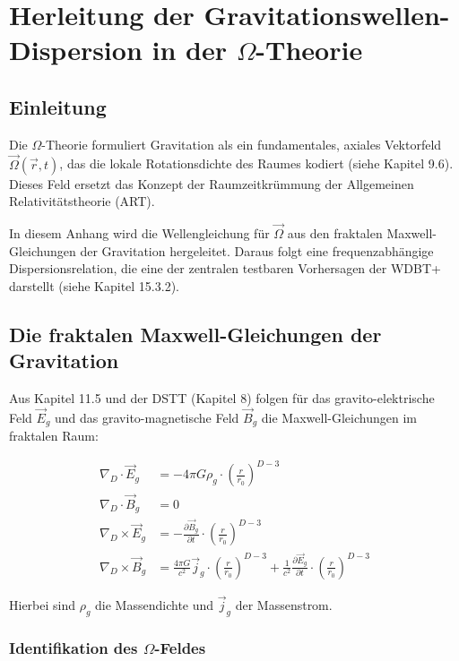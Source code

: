 \chapter{Herleitung der Gravitationswellen-Dispersion in der $\Omega$-Theorie}

\section{Einleitung}

Die $\Omega$-Theorie formuliert Gravitation als ein fundamentales, axiales Vektorfeld 
$\vec{\Omega}(\vec{r}, t)$, das die lokale Rotationsdichte des Raumes kodiert 
(siehe Kapitel 9.6). Dieses Feld ersetzt das Konzept der Raumzeitkrümmung der 
Allgemeinen Relativitätstheorie (ART).

In diesem Anhang wird die Wellengleichung für $\vec{\Omega}$ aus den fraktalen 
Maxwell-Gleichungen der Gravitation hergeleitet. Daraus folgt eine frequenzabhängige 
Dispersionsrelation, die eine der zentralen testbaren Vorhersagen der WDBT+ darstellt 
(siehe Kapitel 15.3.2).

\section{Die fraktalen Maxwell-Gleichungen der Gravitation}

Aus Kapitel 11.5 und der DSTT (Kapitel 8) folgen für das gravito-elektrische Feld 
$\vec{E}_g$ und das gravito-magnetische Feld $\vec{B}_g$ die Maxwell-Gleichungen 
im fraktalen Raum:

\begin{align}
\nabla_D \cdot \vec{E}_g &= -4\pi G\rho_g \cdot \left(\frac{r}{r_0}\right)^{D-3} \tag{I.1} \\
\nabla_D \cdot \vec{B}_g &= 0 \tag{I.2} \\
\nabla_D \times \vec{E}_g &= -\frac{\partial \vec{B}_g}{\partial t} \cdot \left(\frac{r}{r_0}\right)^{D-3} \tag{I.3} \\
\nabla_D \times \vec{B}_g &= \frac{4\pi G}{c^2} \vec{j}_g \cdot \left(\frac{r}{r_0}\right)^{D-3} + \frac{1}{c^2} \frac{\partial \vec{E}_g}{\partial t} \cdot \left(\frac{r}{r_0}\right)^{D-3} \tag{I.4}
\end{align}

Hierbei sind $\rho_g$ die Massendichte und $\vec{j}_g$ der Massenstrom.

\subsection{Identifikation des $\Omega$-Feldes}

